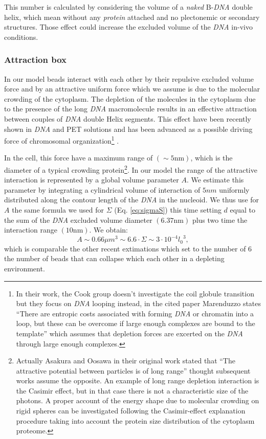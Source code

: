\documentclass[12pt,a4paper,notitlepage]{article}
\newcommand{\nm}{\mathrm{nm}}
\newcommand{\dna}{\emph{DNA}\xspace}
\begin{document}
This number is calculated by considering the
volume of a {\it naked} B-\dna double helix, which mean without any
{\it protein} attached and no plectonemic or secondary
structures. Those effect could increase the excluded volume of the
\dna in-vivo conditions.

\subsubsection{Attraction box}
In our model beads interact with each other by their repulsive
excluded volume force and by an attractive uniform force which we
assume is due to the molecular crowding of the cytoplasm. The
depletion of the molecules in the cytoplasm due to the presence of the
long \dna macromolecule results in an effective attraction between
couples of \dna double Helix segments. This effect
have been recently shown in \dna and PET solutions
\cite{Kojima2006} and has been advanced as a possible
driving force of chromosomal organization\footnote{
  In their work, the Cook group doesn't investigate the coil
  globule transition but they focus on \dna looping instead, in the
  cited paper Marenduzzo states ``There are entropic costs associated
  with forming \dna or chromatin into a loop, but these can be overcome
  if large enough complexes are bound to the template'' which assumes
  that depletion forces are excerted on the \dna through large enough
  complexes.}
\cite{Marenduzzo2006}. 

In the cell, this force have a maximum range of $(\sim 5 \nm)$, which
is the diameter of a typical crowding protein\footnote{
  Actually Asakura and Oosawa\cite{Asakura1958} in their original work
  stated that ``The attractive potential between particles is of long
  range'' thought subsequent works assume the opposite. An example of
  long range depletion interaction is the Casimir effect, but in that
  case there is not a characteristic size of the photons. A proper
  account of the energy shape due to molecular crowding on rigid
  spheres can be investigated following the Casimir-effect explanation
  procedure taking into account the protein size distribution of the
  cytoplasm proteome.}.
In our model the range of the attractive interaction is represented by
a global volume parameter $A$. We estimate this parameter by
integrating a cylindrical volume of interaction of $5 nm$ uniformly distributed
along the contour length of the \dna in the nucleoid. We thus use for
$A$ the same formula we used for $\Sigma$ (Eq. \ref{eq:sigmaS}) this
time setting $d$ equal to the sum of the \dna excluded volume
diameter $(6.37 \nm)$ plus two time the interaction range $(10
\nm)$. We obtain:
\begin{equation}
A \sim 0.66 \mu m^3 \sim 6.6 \cdot \Sigma \sim 3 \cdot 10^{-4} {l_0}^3,
\label{eq:alpha}
\end{equation} 
which is comparable the other recent extimations \cite{Marenduzzo2006}
which set to the number of 6 the number of beads that can collapse
which each other in a depleting environment.
\end{document}
